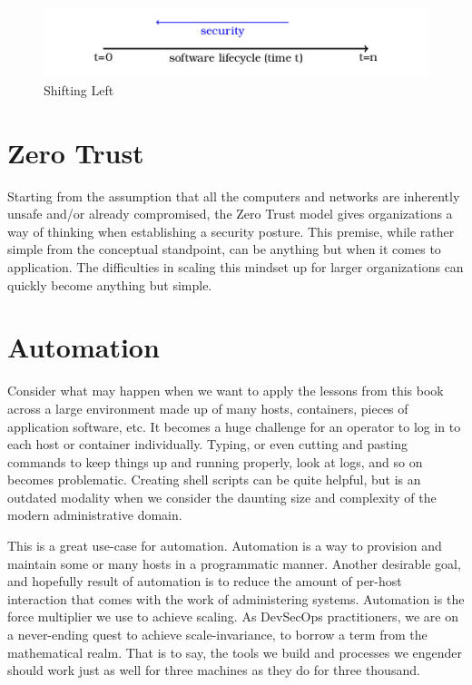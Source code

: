 \justify{}
\begin{figure}[!htb]
\centering
\includegraphics{../images/shift_left.png}
\caption{Shifting Left}
\label{shift}
\end{figure}

\section{Zero Trust}

\justify{}
Starting from the assumption that all the computers and networks are inherently unsafe and/or already compromised, the 
Zero Trust model gives organizations a way of thinking when establishing a security posture.\cite{zerotrust} This premise,
while rather simple from the conceptual standpoint, can be anything but when it comes to application. The difficulties in
scaling this mindset up for larger organizations can quickly become anything but simple.

\section{Automation}

\justify{}
Consider what may happen when we want to apply the lessons from this book across a large environment made up of many hosts,
containers, pieces of application software, etc. It becomes a huge challenge for an operator to log in to each host or container
individually. Typing, or even cutting and pasting commands to keep things up and running properly, look at logs,
and so on becomes problematic. Creating shell scripts can be quite helpful, but is an outdated modality when we consider
the daunting size and complexity of the modern administrative domain.

\justify{}
This is a great use-case for automation. Automation is a way to provision and maintain some or many hosts
in a programmatic manner. Another desirable goal, and hopefully result of automation is to reduce the amount of
per-host interaction that comes with the work of administering systems. Automation is the force multiplier we use to achieve
scaling. As DevSecOps practitioners, we are on a never-ending quest to achieve
scale-invariance, to borrow a term from the mathematical realm. That is to say, the tools we
build and processes we engender should work just as well for three machines as they do for three thousand.

